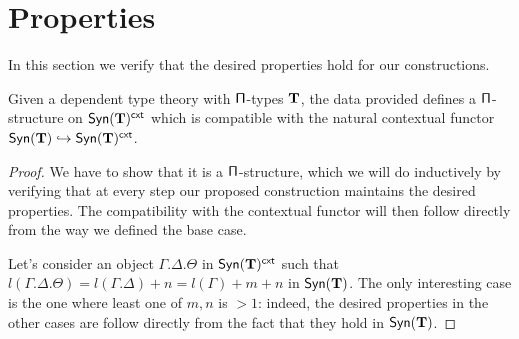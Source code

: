 \section{Properties}

In this section we verify that the desired properties hold for our
constructions.

\begin{lem}\label{extpistruct}
  Given a dependent type theory with $\operatorname{\mathsf{\Pi}}$-types $\operatorname{\mathbf{T}}$, the data provided
  defines a $\operatorname{\mathsf{\Pi}}$-structure on $\mathsf{Syn}(\mathbf{T})^{\operatorname{\mathsf{cxt}}}$ which is
  compatible with the natural contextual functor
  $\mathsf{Syn}(\mathbf{T})\hookrightarrow\mathsf{Syn}(\mathbf{T})^{\operatorname{\mathsf{cxt}}}$.
\end{lem}
\begin{proof}
  We have to
  show that it is a $\operatorname{\mathsf{\Pi}}$-structure, which we will do inductively by verifying
  that at every step our proposed construction maintains the desired properties.
  The compatibility with the contextual functor will then follow directly from
  the way we defined the base case.

  \noindent
  Let's consider an object $\Gamma.\Delta.\Theta$ in $\mathsf{Syn}(\mathbf{T})^{\operatorname{\mathsf{cxt}}}$ such that
  $l(\Gamma.\Delta.\Theta)=l(\Gamma.\Delta)+n=l(\Gamma)+m+n$ in $\mathsf{Syn}(\mathbf{T})$. The
  only interesting case is the one where least one of $m,n$ is
  $>1$: indeed, the desired properties in the other cases are
  follow directly from the fact that they hold in $\mathsf{Syn}(\mathbf{T})$.


\end{proof}

